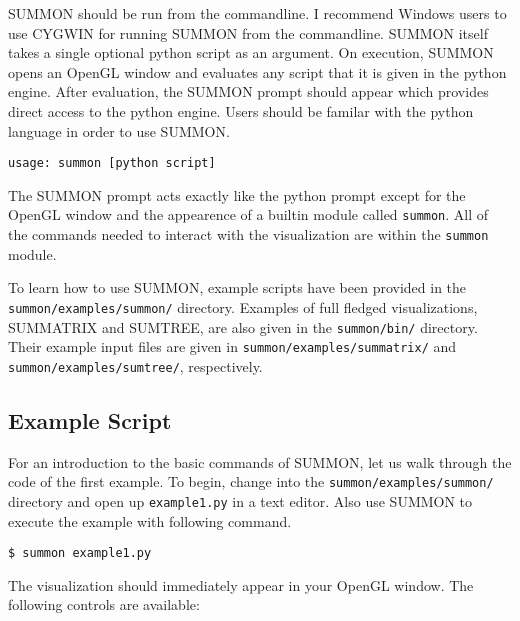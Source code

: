 \documentclass[12pt]{article}
\newcommand{\code}[1]{{\tt #1}}
\newcommand{\codeblock}[1]{\vspace{.1in} {\tt #1} \vspace{.1in}}
\begin{document}
SUMMON should be run from the commandline.  I recommend Windows users to use
CYGWIN for running SUMMON from the commandline.  SUMMON itself takes a single
optional python script as an argument.  On execution, SUMMON opens an OpenGL
window and evaluates any script that it is given in the python engine. After
evaluation, the SUMMON prompt should appear which provides direct access to the
python engine.  Users should be familar with the python language in order to use
SUMMON.

\codeblock{usage: summon [python script]}


The SUMMON prompt acts exactly like the python prompt except for the OpenGL
window and the appearence of a builtin module called \code{summon}.  All of the
commands needed to interact with the visualization are within the \code{summon} 
module.  

To learn how to use SUMMON, example scripts have been provided in the 
\code{summon/examples/summon/} directory.  Examples of full fledged
visualizations, SUMMATRIX and SUMTREE, are also given in the \code{summon/bin/}
directory.  Their example input files are given in
\code{summon/examples/summatrix/} and \code{summon/examples/sumtree/},
respectively.



\subsection{Example Script}

For an introduction to the basic commands of SUMMON, let us walk through the
code of the first example.  To begin, change into the
\code{summon/examples/summon/} directory and open up \code{example1.py} in a
text editor.  Also use SUMMON to execute the example with following command.

\codeblock{\$ summon example1.py}

The visualization should immediately appear in your OpenGL window.  The
following controls are available:
\end{document}
